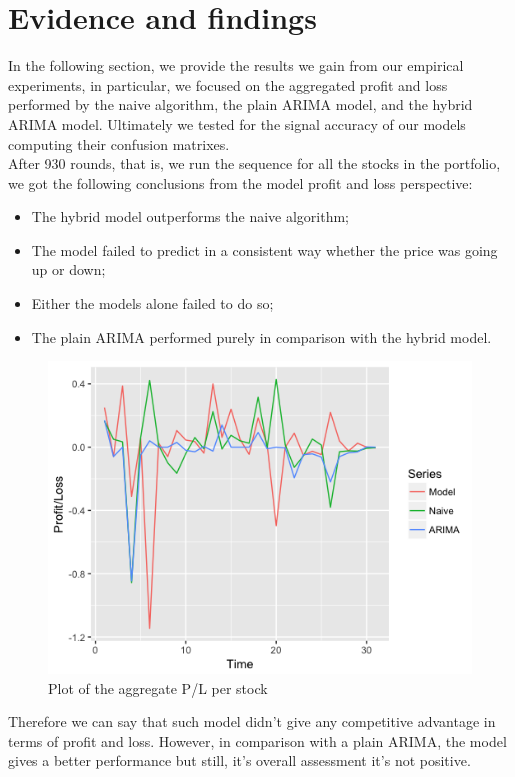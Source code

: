 \documentclass[twocolumn]{article}
\begin{document}
\section{Evidence and findings}
In the following section, we provide the results we gain from our empirical experiments, in particular, we focused on the aggregated profit and loss performed by the naive algorithm, the plain ARIMA model, and the hybrid ARIMA model. Ultimately we tested for the signal accuracy of our models computing their confusion matrixes. 
\\
After 930 rounds, that is, we run the sequence for all the stocks in the portfolio, we got the following conclusions from the model profit and loss perspective:
\begin{itemize}
    \item The hybrid model outperforms the naive algorithm;
    \item The model failed to predict in a consistent way whether the price was going up or down;
    \item Either the models alone failed to do so;
    \item The plain ARIMA performed purely in comparison with the hybrid model.
\end{itemize}

\begin{figure}
    \centering
    \includegraphics[width=1\linewidth, ]{Paper/images/PL_plot.png}
    \caption{Plot of the aggregate P/L per stock}
    \label{pl_portfolio}
\end{figure}

Therefore we can say that such model didn't give any competitive advantage in terms of profit and loss. However, in comparison with a plain ARIMA, the model gives a better performance but still, it's overall assessment it's not positive.
\end{document}
